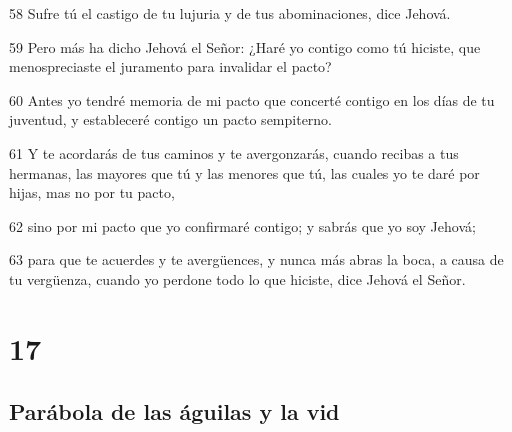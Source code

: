 \par 58 Sufre tú el castigo de tu lujuria y de tus abominaciones, dice Jehová.
\par 59 Pero más ha dicho Jehová el Señor: ¿Haré yo contigo como tú hiciste, que menospreciaste el juramento para invalidar el pacto?
\par 60 Antes yo tendré memoria de mi pacto que concerté contigo en los días de tu juventud, y estableceré contigo un pacto sempiterno.
\par 61 Y te acordarás de tus caminos y te avergonzarás, cuando recibas a tus hermanas, las mayores que tú y las menores que tú, las cuales yo te daré por hijas, mas no por tu pacto,
\par 62 sino por mi pacto que yo confirmaré contigo; y sabrás que yo soy Jehová;
\par 63 para que te acuerdes y te avergüences, y nunca más abras la boca, a causa de tu vergüenza, cuando yo perdone todo lo que hiciste, dice Jehová el Señor.

\chapter{17}

\section*{Parábola de las águilas y la vid }

